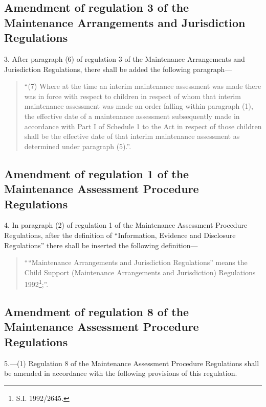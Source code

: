 \documentclass[a4paper]{article}
\begin{document}
\subsection[3. Amendment of regulation 3 of the Maintenance Arrangements and Jurisdiction Regulations]{Amendment of regulation 3 of the Maintenance Arrangements and Jurisdiction Regulations}

3.  After paragraph (6) of regulation 3 of the Maintenance Arrangements and Jurisdiction Regulations, there shall be added the following paragraph—
\begin{quotation}
“(7) Where at the time an interim maintenance assessment was made there was in force with respect to children in respect of whom that interim maintenance assessment was made an order falling within paragraph (1), the effective date of a maintenance assessment subsequently made in accordance with Part I of Schedule 1 to the Act in respect of those children shall be the effective date of that interim maintenance assessment as determined under paragraph (5).”.
\end{quotation}

\subsection[4. Amendment of regulation 1 of the Maintenance Assessment Procedure Regulations]{Amendment of regulation 1 of the Maintenance Assessment Procedure Regulations}

4.  In paragraph (2) of regulation 1 of the Maintenance Assessment Procedure Regulations, after the definition of “Information, Evidence and Disclosure Regulations” there shall be inserted the following definition—
\begin{quotation}
““Maintenance Arrangements and Jurisdiction Regulations” means the Child Support (Maintenance Arrangements and Jurisdiction) Regulations 1992\footnote{\frenchspacing S.I. 1992/2645.};”.
\end{quotation}

\subsection[5. Amendment of regulation 8 of the Maintenance Assessment Procedure Regulations]{Amendment of regulation 8 of the Maintenance Assessment Procedure Regulations}

5.—(1) Regulation 8 of the Maintenance Assessment Procedure Regulations shall be amended in accordance with the following provisions of this regulation.
\end{document}

